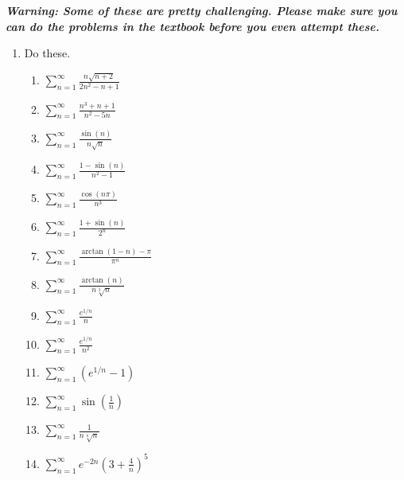 \documentclass[11pt]{article}
\begin{document}
\noindent \emph{\textbf{Warning: Some of these are pretty challenging. Please
make sure you can do the problems in the textbook before you even attempt
these.}}

\begin{enumerate}

  \item Do these. \begin{enumerate}

    \item $\displaystyle \sum_{n=1}^\infty
    \frac{n\sqrt{n+2}}{2n^2-n+1}$

    \item $\displaystyle \sum_{n=1}^\infty
    \frac{n^3+n+1}{n^2-5n}$

    \item $\displaystyle \sum_{n=1}^\infty
    \frac{\sin(n)}{n\sqrt n}$

    \item $\displaystyle \sum_{n=1}^\infty
    \frac{1-\sin(n)}{n^2 - 1}$

    \item $\displaystyle \sum_{n=1}^\infty
    \frac{\cos(n\pi)}{n^3}$

    \item $\displaystyle \sum_{n=1}^\infty
    \frac{1+\sin(n)}{2^n}$

    \item $\displaystyle \sum_{n=1}^\infty
    \frac{\arctan(1-n) - \pi}{\pi^n}$

    \item $\displaystyle \sum_{n=1}^\infty
    \frac{\arctan(n)}{n\sqrt[3]n}$

    \item $\displaystyle \sum_{n=1}^\infty
    \frac{e^{1/n}}{n}$

    \item $\displaystyle \sum_{n=1}^\infty
    \frac{e^{1/n}}{n^2}$

    \item $\displaystyle \sum_{n=1}^\infty
    \left( e^{1/n} - 1 \right)$

    \item $\displaystyle \sum_{n=1}^\infty
    \sin\left( \frac1n \right)$

    \item $\displaystyle \sum_{n=1}^\infty
    \frac1{n\sqrt[n]n}$

    \item $\displaystyle \sum_{n=1}^\infty
    e^{-2n} \left( 3 + \frac4n \right)^5$


\end{enumerate}
\end{enumerate}
\end{document}

